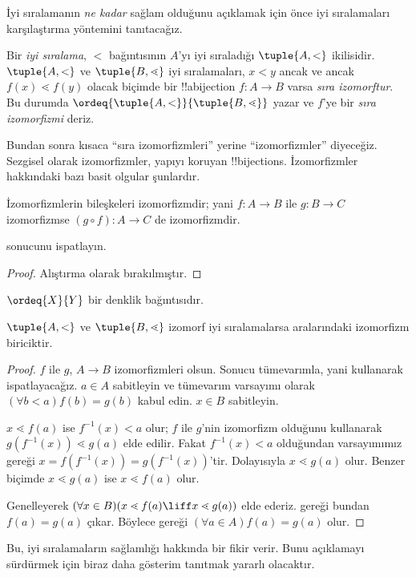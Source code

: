 \documentclass[../../../include/open-logic-section]{subfiles}
\begin{document}

İyi sıralamanın \emph{ne kadar} sağlam olduğunu açıklamak için önce iyi
sıralamaları karşılaştırma yöntemini tanıtacağız.

\begin{defn}
Bir \emph{iyi sıralama}, $<$ bağıntısının $A$'yı iyi sıraladığı
$\tuple{A,<}$ ikilisidir. $\tuple{A,<}$ ve $\tuple{B,\lessdot}$ iyi
sıralamaları, $x<y$ ancak ve ancak $f(x)\lessdot f(y)$ olacak biçimde bir
!!a{bijection} $f\colon A\to B$ varsa \emph{sıra izomorftur}. Bu durumda
$\ordeq{\tuple{A,<}}{\tuple{B,\lessdot}}$ yazar ve $f$'ye bir
\emph{sıra izomorfizmi} deriz.
\end{defn}
\noindent
Bundan sonra kısaca ``sıra izomorfizmleri'' yerine ``izomorfizmler''
diyeceğiz. Sezgisel olarak izomorfizmler, yapıyı koruyan
!!{bijection}s. İzomorfizmler hakkındaki bazı basit olgular şunlardır.

\begin{lem}
İzomorfizmlerin bileşkeleri izomorfizmdir; yani $f\colon A\to B$ ile
$g\colon B\to C$ izomorfizmse $(g\circ f)\colon A\to C$ de izomorfizmdir.
\end{lem}
\begin{prob}
	 sonucunu ispatlayın.
\end{prob}
\begin{proof}
Alıştırma olarak bırakılmıştır.
\end{proof}
\begin{cor}
	$\ordeq{X}{Y}$ bir denklik bağıntısıdır.
\end{cor}
\begin{prop}
$\tuple{A,<}$ ve $\tuple{B,\lessdot}$ izomorf iyi sıralamalarsa aralarındaki
izomorfizm biriciktir.
\end{prop}

\begin{proof}
$f$ ile $g$, $A\to B$ izomorfizmleri olsun. Sonucu tümevarımla, yani
 kullanarak ispatlayacağız. $a\in A$ sabitleyin
ve tümevarım varsayımı olarak $(\forall b<a)f(b)=g(b)$ kabul edin.
$x\in B$ sabitleyin.

$x\lessdot f(a)$ ise $f^{-1}(x)<a$ olur; $f$ ile $g$'nin izomorfizm
olduğunu kullanarak $g(f^{-1}(x))\lessdot g(a)$ elde edilir. Fakat
$f^{-1}(x)<a$ olduğundan varsayımımız gereği
$x=f(f^{-1}(x))=g(f^{-1}(x))$'tir. Dolayısıyla $x\lessdot g(a)$ olur.
Benzer biçimde $x\lessdot g(a)$ ise $x\lessdot f(a)$ olur.

Genelleyerek $(\forall x\in B)(x\lessdot f(a)\liff x\lessdot g(a))$
elde ederiz. 
gereği bundan $f(a)=g(a)$ çıkar. Böylece
 gereği $(\forall a\in A)f(a)=g(a)$ olur.
\end{proof}\noindent
Bu, iyi sıralamaların sağlamlığı hakkında bir fikir verir. Bunu açıklamayı
sürdürmek için biraz daha gösterim tanıtmak yararlı olacaktır.
\end{document}
